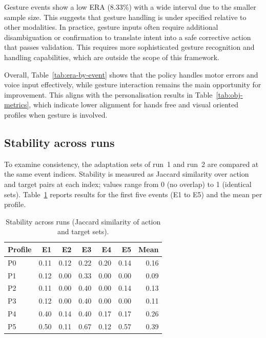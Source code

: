 Gesture events show a low ERA (8.33\%) with a wide interval due to the smaller sample size. This suggests that gesture handling is under specified relative to other modalities. In practice, gesture inputs often require additional disambiguation or confirmation to translate intent into a safe corrective action that passes validation. This requires more sophisticated gesture recognition and handling capabilities, which are outside the scope of this framework.

Overall, Table~\ref{tab:era-by-event} shows that the policy handles motor errors and voice input effectively, while gesture interaction remains the main opportunity for improvement. This aligns with the personalisation results in Table~\ref{tab:obj-metrics}, which indicate lower alignment for hands free and visual oriented profiles when gesture is involved.

\subsection{Stability across runs}
\label{sec:stability-runs}
To examine consistency, the adaptation sets of run~1 and run~2 are compared at the same event indices. Stability is measured as Jaccard similarity over action and target pairs at each index; values range from 0 (no overlap) to 1 (identical sets). Table~\ref{tab:stability} reports results for the first five events (E1 to E5) and the mean per profile.

\begin{table}[H]
\centering
\caption{Stability across runs (Jaccard similarity of action and target sets).}
\label{tab:stability}
\begin{tabular}{lrrrrrr}
\toprule
\textbf{Profile} & \textbf{E1} & \textbf{E2} & \textbf{E3} & \textbf{E4} & \textbf{E5} & \textbf{Mean} \\
\midrule
P0 & 0.11 & 0.12 & 0.22 & 0.20 & 0.14 & 0.16 \\
P1 & 0.12 & 0.00 & 0.33 & 0.00 & 0.00 & 0.09 \\
P2 & 0.11 & 0.00 & 0.40 & 0.00 & 0.14 & 0.13 \\
P3 & 0.12 & 0.00 & 0.40 & 0.00 & 0.00 & 0.11 \\
P4 & 0.40 & 0.14 & 0.40 & 0.17 & 0.17 & 0.26 \\
P5 & 0.50 & 0.11 & 0.67 & 0.12 & 0.57 & 0.39 \\
\bottomrule
\end{tabular}
\end{table}


